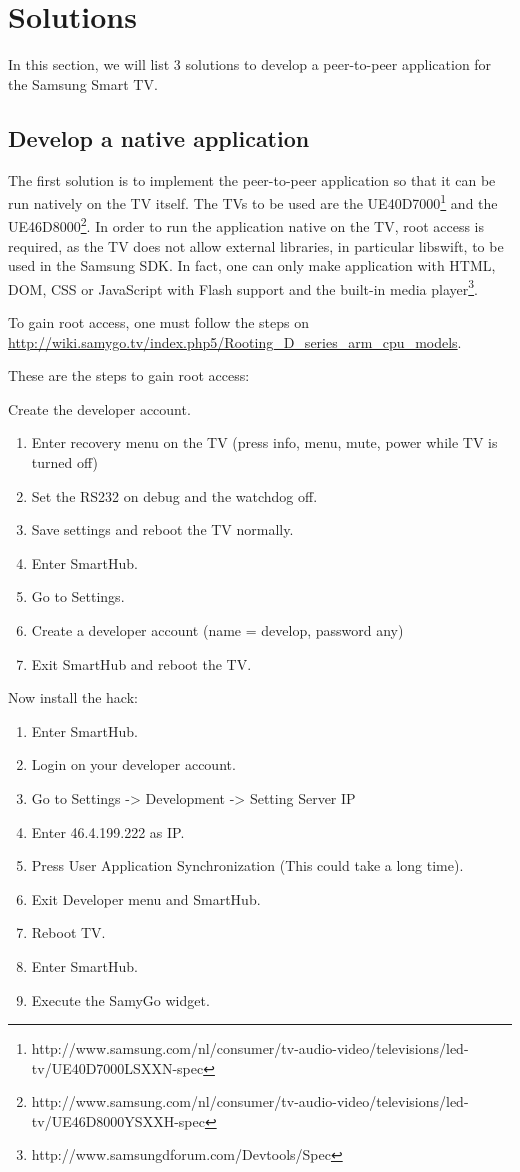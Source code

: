 \chapter*{Solutions}

In this section, we will list 3 solutions to develop a peer-to-peer application for the Samsung Smart TV.

\section*{Develop a native application}
The first solution is to implement the peer-to-peer application so that it can be run natively on the TV itself.
The TVs to be used are the UE40D7000\footnote{http://www.samsung.com/nl/consumer/tv-audio-video/televisions/led-tv/UE40D7000LSXXN-spec} 
and the UE46D8000\footnote{http://www.samsung.com/nl/consumer/tv-audio-video/televisions/led-tv/UE46D8000YSXXH-spec}.
In order to run the application native on the TV, root access is required, 
as the TV does not allow external libraries, in particular libswift, to be used in the Samsung SDK.
In fact, one can only make application with HTML, DOM, CSS or JavaScript with Flash support and the built-in media player\footnote{http://www.samsungdforum.com/Devtools/Spec}.

To gain root access, one must follow the steps on \url{http://wiki.samygo.tv/index.php5/Rooting_D_series_arm_cpu_models}.

These are the steps to gain root access:

Create the developer account.
\begin{enumerate}
\item Enter recovery menu on the TV (press info, menu, mute, power while TV is turned off)
\item Set the RS232 on debug and the watchdog off.
\item Save settings and reboot the TV normally.
\item Enter SmartHub.
\item Go to Settings.
\item Create a developer account (name = develop, password any)
\item Exit SmartHub and reboot the TV.
\end{enumerate}

\newpage
Now install the hack:

\begin{enumerate}
\item Enter SmartHub.
\item Login on your developer account.
\item Go to Settings -> Development -> Setting Server IP
\item Enter 46.4.199.222 as IP.
\item Press User Application Synchronization (This could take a long time).
\item Exit Developer menu and SmartHub.
\item Reboot TV.
\item Enter SmartHub.
\item Execute the SamyGo widget.
\end{enumerate} 


